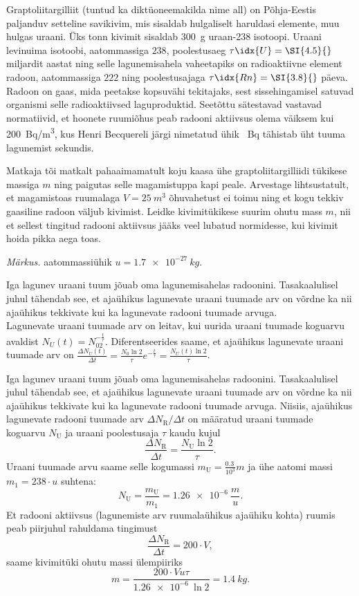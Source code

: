 
Graptoliitargilliit (tuntud ka diktüoneemakilda nime all) on Põhja-Eestis paljanduv setteline savikivim, mis sisaldab hulgaliselt haruldasi elemente, muu hulgas uraani. Üks tonn kivimit sisaldab \SI{300}{g} uraan-238 isotoopi. Uraani levinuima isotoobi, aatommassiga $238$, poolestusaeg $\tau\idx{U}=\SI{4.5}{}$ miljardit aastat ning selle lagunemisahela vaheetapiks on radioaktiivne element radoon, aatommassiga $222$ ning poolestusajaga $\tau\idx{Rn}=\SI{3.8}{}$ päeva. Radoon on gaas, mida peetakse kopsuvähi tekitajaks, sest sissehingamisel satuvad organismi selle radioaktiivsed laguproduktid. Seetõttu sätestavad vastavad normatiivid, et hoonete ruumiõhus peab radooni aktiivsus olema väiksem kui \SI{200}{Bq/m^3}, kus	Henri Becquereli järgi nimetatud ühik \SI{}{Bq} tähistab üht tuuma lagunemist sekundis.

Matkaja tõi matkalt pahaaimamatult koju kaasa ühe graptoliitargilliidi tükikese massiga $m$ ning paigutas selle magamistuppa kapi peale. Arvestage lihtsustatult, et magamistoas ruumalaga $V=\SI{25}{m^3}$ õhuvahetust ei toimu ning et kogu tekkiv gaasiline radoon väljub kivimist. Leidke kivimitükikese suurim ohutu mass $m$, nii et sellest tingitud radooni aktiivsus jääks veel lubatud normidesse, kui kivimit hoida pikka aega toas. 

\emph{Märkus.} aatommassiühik $u=\SI{1.7e-27}{kg}$.

\hint
Iga lagunev uraani tuum jõuab oma lagunemisahelas radoonini. Tasakaalulisel juhul tähendab see, et ajaühikus lagunevate uraani tuumade arv on võrdne ka nii ajaühikus tekkivate kui ka lagunevate radooni tuumade arvuga.\\
Lagunevate uraani tuumade arv on leitav, kui uurida uraani tuumade koguarvu avaldist $N_U(t) = N_02^{-\frac{t}{\tau}}$. Diferentseerides saame, et ajaühikus lagunevate uraani tuumade arv on $\frac{\Delta N_U(t)}{\Delta t} = \frac{N_0\ln 2}{\tau}e^{-\frac{t}{\tau}} = \frac{N_U(t)\ln 2}{\tau}$. 

\solu
Iga lagunev uraani tuum jõuab oma lagunemisahelas radoonini. Tasakaalulisel juhul tähendab see, et ajaühikus lagunevate uraani tuumade arv on võrdne ka nii ajaühikus tekkivate kui ka lagunevate radooni tuumade arvuga. Niisiis, ajaühikus lagunevate radooni tuumade arv $\Delta N_\text{R} / \Delta t$ on määratud uraani tuumade koguarvu $N_\text{U}$ ja uraani poolestusaja $\tau$ kaudu kujul
\[
\frac{\Delta N_\text{R}}{\Delta t} = \frac{N_\text{U} \ln 2}{\tau}.
\]
Uraani tuumade arvu saame selle kogumassi $m_\text{U} = \frac{\SI{0.3}{}}{10^3} m$ ja ühe aatomi massi $m_1=238 \cdot u$ suhtena:
\[
N_\text{U}=\frac{m_\text{U}}{m_1}=\SI{1.26e-6}{} \frac{m}{u}.
\]
Et radooni aktiivsus (lagunemiste arv ruumalaühikus ajaühiku kohta) ruumis peab piirjuhul rahuldama tingimust
\[
\frac{\Delta N_\text{R}}{\Delta t} = 200\cdot V,
\]
saame kivimitüki ohutu massi ülempiiriks
\[
m = \frac{200\cdot V u \tau}{\SI{1.26e-6}{}\ln 2}=\SI{1.4}{kg}.
\]

